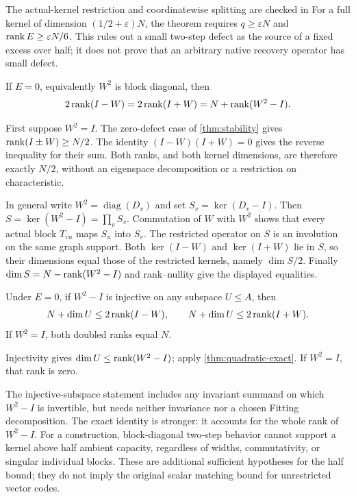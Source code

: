 The actual-kernel restriction and coordinatewise splitting are checked in
For a full kernel of dimension $(1/2+\varepsilon)N$, the theorem requires
$q\geq\varepsilon N$ and $\operatorname{rank} E\geq\varepsilon N/6$. This rules out
a small two-step defect as the source of a fixed excess over half; it
does not prove that an arbitrary native recovery operator has small defect.

\begin{theorem}\label{thm:quadratic-exact}
If $E=0$, equivalently $W^2$ is block diagonal, then
\[
 2\operatorname{rank}(I-W)=2\operatorname{rank}(I+W)=N+\operatorname{rank}(W^2-I).
\]
\end{theorem}
\begin{outline}
First suppose $W^2=I$. The zero-defect case of \cref{thm:stability}
gives $\operatorname{rank}(I\pm W)\geq N/2$. The identity
$(I-W)(I+W)=0$ gives the reverse inequality for their sum. Both ranks,
and both kernel dimensions, are therefore exactly $N/2$, without an
eigenspace decomposition or a restriction on characteristic.

In general write $W^2=\operatorname{diag}(D_v)$ and set
$S_v=\ker(D_v-I)$. Then $S=\ker(W^2-I)=\prod_v S_v$.
Commutation of $W$ with $W^2$ shows that every actual block $T_{vu}$
maps $S_u$ into $S_v$. The restricted operator on $S$ is an involution
on the same graph support. Both $\ker(I-W)$ and $\ker(I+W)$ lie in $S$,
so their dimensions equal those of the restricted kernels, namely
$\dim S/2$. Finally $\dim S=N-\operatorname{rank}(W^2-I)$ and rank--nullity give
the displayed equalities.
\end{outline}

\begin{corollary}
\label{cor:quadratic-refinement}
Under $E=0$, if $W^2-I$ is injective on any subspace $U\leq A$, then
\[
 N+\dim U\leq2\operatorname{rank}(I-W),\qquad
 N+\dim U\leq2\operatorname{rank}(I+W).
\]
If $W^2=I$, both doubled ranks equal $N$.
\end{corollary}
\begin{outline}
Injectivity gives $\dim U\leq\operatorname{rank}(W^2-I)$; apply
\cref{thm:quadratic-exact}. If $W^2=I$, that rank is zero.
\end{outline}

The injective-subspace statement includes any invariant summand on which
$W^2-I$ is invertible, but needs neither invariance nor a chosen Fitting
decomposition. The exact identity is stronger: it accounts for the
whole rank of $W^2-I$. For a construction, block-diagonal two-step
behavior cannot support a kernel above half ambient capacity, regardless
of widths, commutativity, or singular individual blocks. These are
additional sufficient hypotheses for the half bound; they do not imply
the original scalar matching bound for unrestricted vector codes.
